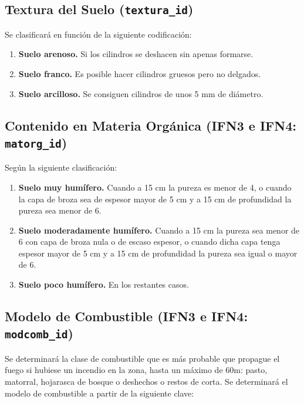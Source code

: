 \subsection{Textura del Suelo (\texttt{textura\_id})}\label{sec:textura}

Se clasificará en función de la siguiente codificación:

\begin{enumerate}
    \item \textbf{Suelo arenoso.} Si los cilindros se deshacen sin apenas formarse.
    \item \textbf{Suelo franco.} Es posible hacer cilindros gruesos pero no delgados.
    \item \textbf{Suelo arcilloso.} Se consiguen cilindros de unos 5 mm de diámetro.
\end{enumerate}



\subsection{Contenido en Materia Orgánica (IFN3 e IFN4: \texttt{matorg\_id})}\label{sec:MatOrg}

Según la siguiente clasificación:

\begin{enumerate}
    \item \textbf{Suelo muy humífero.} Cuando a 15 cm la pureza es menor de 4, o cuando la capa de broza sea de espesor mayor de 5 cm y a 15 cm de profundidad la pureza sea menor de 6.
    \item \textbf{Suelo moderadamente humífero.} Cuando a 15 cm la pureza sea menor de 6 con capa de broza nula o de escaso espesor, o cuando dicha capa tenga espesor mayor de 5 cm y a 15 cm de profundidad la pureza sea igual o mayor de 6.
    \item \textbf{Suelo poco humífero.} En los restantes casos.
\end{enumerate}


\subsection{Modelo de Combustible (IFN3 e IFN4: \texttt{modcomb\_id})}\label{sec:modComb}
Se determinará la clase de combustible que es más probable que propague el fuego si hubiese un incendio en la zona, hasta un máximo de 60m: pasto, matorral, hojarasca de bosque o deshechos o restos de corta. Se determinará el modelo de combustible a partir de la siguiente clave:

